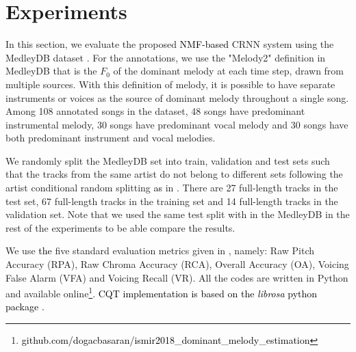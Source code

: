 \documentclass{article}
\newcommand{\gp}[1]{{\textcolor{black}{#1}}}
\newcommand{\se}[1]{{\textcolor{black}{#1}}}
\newcommand{\db}[1]{{\textcolor{black}{#1}}}
\newcommand{\dbcor}[2]{{\textcolor{black}{#2}}}
\newcommand{\jb}[1]{{\textcolor{black}{#1}}}
\begin{document}

\section{Experiments}\label{sec:experiments}
In this section, we evaluate the proposed \se{NMF-based} CRNN system using the MedleyDB dataset \cite{medleydb}. For the annotations, we use the "Melody2" definition in MedleyDB that is the $F_0$ of the dominant melody at each time step, drawn from multiple sources. With this definition of melody, it is possible to have separate instruments or voices as the source of dominant melody throughout a single song. Among 108 annotated songs in the dataset, 48 songs have predominant instrumental melody, 30 songs have predominant vocal melody and 30 songs have both predominant instrument and vocal melodies.

We randomly split the MedleyDB set into train, validation and test sets such that the tracks from the same artist do not belong to different sets following the artist conditional random splitting \dbcor{given}{as} in \cite{bittner2017_deep,bittner2016_comparison}. There are 27 full-length tracks in the test set, 67 full-length tracks in the training set and 14 full-length tracks in the validation set. Note that we used the same test split with \cite{bittner2017_deep} in the MedleyDB in the rest of the experiments to be able compare the results. 

We use \gp{the} five standard evaluation metrics given in \cite{Metrics}, namely: Raw Pitch Accuracy (RPA), Raw Chroma Accuracy (RCA), Overall Accuracy (OA), Voicing False Alarm (VFA) and Voicing Recall (VR). All the codes are written in Python and available online\footnote{
\dbcor{To be given in camera ready version.}{github.com/dogacbasaran/ismir2018\_dominant\_melody\_estimation}}. \db{CQT implementation is based on \jb{the} \emph{librosa} python package \cite{librosa}.}
\end{document}
